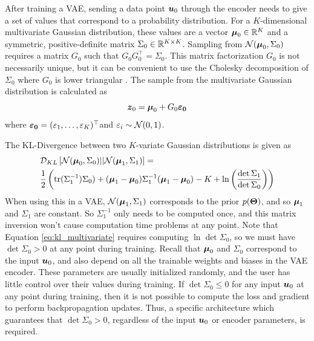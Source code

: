 After training a VAE, sending a data point $\boldsymbol{u}_0$ through the encoder needs to give a set of values that correspond to a probability distribution. For a $K$-dimensional multivariate Gaussian distribution, these values are a vector $\boldsymbol{\mu}_0 \in \mathbb{R}^K$ and a symmetric, positive-definite matrix $\Sigma_0 \in \mathbb{R}^{K\times K}$. Sampling from $\mathcal{N}(\boldsymbol{\mu}_0, \Sigma_0)$ requires a matrix $G_0$ such that $G_0 G_0^\top = \Sigma_0$. This matrix factorization $G_0$ is not necessarily unique, but it can be convenient to use the Cholesky decomposition of $\Sigma_0$ where $G_0$ is lower triangular \cite{atkinson}. The sample from the multivariate Gaussian distribution is calculated as
\begin{equation}
  \boldsymbol{z}_0 = \boldsymbol{\mu}_0 + G_0 \boldsymbol{\varepsilon_0}
  \label{eq:multivariate_sample}
\end{equation}
where $\boldsymbol{\varepsilon_0} = (\varepsilon_1, \ldots, \varepsilon_K)^\top $and $\varepsilon_i \sim \mathcal{N}(0,1)$. 

The KL-Divergence between two $K$-variate Gaussian distributions is given as
\begin{equation}
\begin{split}
  &\mathcal{D}_{KL}\left[\mathcal{N}(\boldsymbol{\mu}_0, \Sigma_0) || \mathcal{N}(\boldsymbol{\mu}_1, \Sigma_1) \right] = \\
&\frac{1}{2} \left( \text{tr}(\Sigma_1^{-1}) \Sigma_0) + (\boldsymbol{\mu}_1 - \boldsymbol{\mu}_0) \Sigma_1^{-1} (\boldsymbol{\mu}_1 - \boldsymbol{\mu}_0) - K + \ln\left( \frac{\det \Sigma_1}{\det \Sigma_0 }\right) \right)
  \label{eq:kl_multivariate}
\end{split}
\end{equation}
When using this in a VAE, $\mathcal{N}(\boldsymbol{\mu}_1, \Sigma_1)$ corresponds to the prior $p(\boldsymbol{\Theta})$, and so $\boldsymbol{\mu}_1$ and $\Sigma_1$ are constant. So $\Sigma_1^{-1}$ only needs to be computed once, and this matrix inversion won't cause computation time problems at any point. Note that Equation \ref{eq:kl_multivariate} requires computing $\ln \det \Sigma_0$, so we must have $\det \Sigma_0 > 0$ at any point during training. Recall that $\boldsymbol{\mu}_0$ and $\Sigma_0$ correspond to the input $\boldsymbol{u}_0$, and also depend on all the trainable weights and biases in the VAE encoder. These parameters are usually initialized randomly, and the user has little control over their values during training. If $\det \Sigma_0 \leq 0$ for any input $\boldsymbol{u}_0$ at any point during training, then it is not possible to compute the loss and gradient to perform backpropagation updates. Thus, a specific architecture which guarantees that $\det \Sigma_0 > 0$, regardless of the input $\boldsymbol{u}_0$ or encoder parameters, is required.

